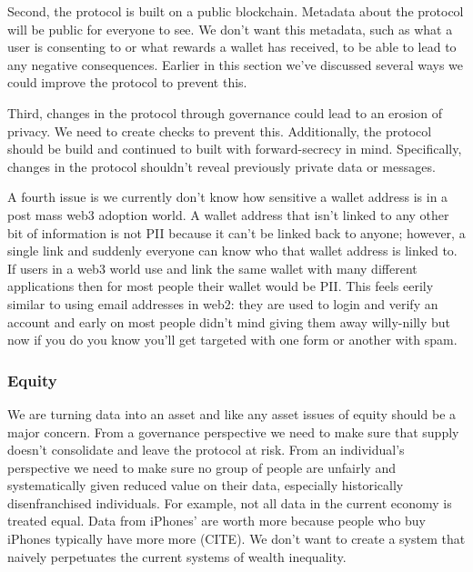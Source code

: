 Second, the protocol is built on a public blockchain. Metadata about the protocol will be public for everyone to see. We don't want this metadata, such as what a user is consenting to or what rewards a wallet has received, to be able to lead to any negative consequences. Earlier in this section we've discussed several ways we could improve the protocol to prevent this.

Third, changes in the protocol through governance could lead to an erosion of privacy. We need to create checks to prevent this. Additionally, the protocol should be build and continued to built with forward-secrecy in mind. Specifically, changes in the protocol shouldn't reveal previously private data or messages.

A fourth issue is we currently don't know how sensitive a wallet address is in a post mass web3 adoption world. A wallet address that isn't linked to any other bit of information is not PII because it can't be linked back to anyone; however, a single link and suddenly everyone can know who that wallet address is linked to. If users in a web3 world use and link the same wallet with many different applications then for most people their wallet would be PII. This feels eerily similar to using email addresses in web2: they are used to login and verify an account and early on most people didn't mind giving them away willy-nilly but now if you do you know you'll get targeted with one form or another with spam. 

\subsubsection{Equity}
We are turning data into an asset and like any asset issues of equity should be a major concern. From a governance perspective we need to make sure that supply doesn't consolidate and leave the protocol at risk. From an individual's perspective we need to make sure no group of people are unfairly and systematically given reduced value on their data, especially historically disenfranchised individuals. For example, not all data in the current economy is treated equal. Data from iPhones' are worth more because people who buy iPhones typically have more more (CITE). We don't want to create a system that naively perpetuates the current systems of wealth inequality.